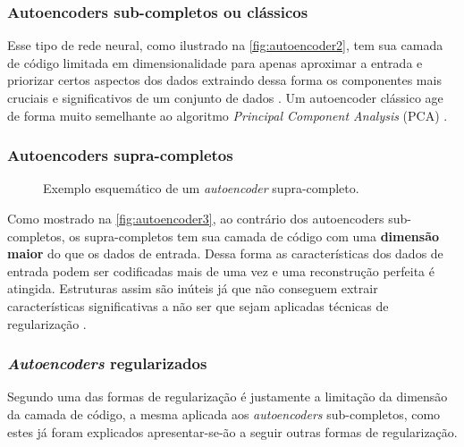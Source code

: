 			\subsubsection{Autoencoders sub-completos ou clássicos}
				\par Esse tipo de rede neural, como ilustrado na  \autoref{fig:autoencoder2}, tem sua camada de código limitada em dimensionalidade para apenas aproximar a entrada e priorizar certos aspectos dos dados extraindo dessa forma os componentes mais cruciais e significativos de um conjunto de dados \cite{Goodfellow-et-al-2016}. Um autoencoder clássico age de forma muito semelhante ao algoritmo
				\textit{Principal Component Analysis} (PCA) \cite{bengio2014representation}.
				  
			\subsubsection{Autoencoders supra-completos}
			
				\begin{figure}[H]
					\centering
					\caption[Exemplo esquemático de um autoencoder supra-completo]{Exemplo esquemático de um \textit{autoencoder} supra-completo.}
					
					\label{fig:autoencoder3}
				\end{figure}
			
				\par Como mostrado na  \autoref{fig:autoencoder3}, ao contrário dos autoencoders sub-completos, os supra-completos tem sua camada de código com uma \textbf{dimensão maior} do que os dados de entrada. Dessa forma as características dos dados de entrada podem ser codificadas mais de uma vez e uma reconstrução perfeita é atingida. Estruturas assim são inúteis já que não conseguem extrair características significativas a não ser que sejam aplicadas técnicas de regularização \cite{bengio2014representation}.
				
			\subsubsection{\textit{Autoencoders} regularizados}
				
				\par Segundo \cite{bengio2014representation} uma das formas de regularização é justamente a limitação da dimensão da camada de código, a mesma aplicada aos \textit{autoencoders} sub-completos, como estes já foram explicados apresentar-se-ão a seguir outras formas de regularização.
				
